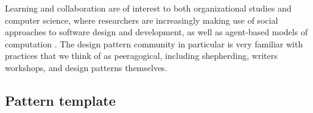 \begin{refsection}



Learning and collaboration are of interest to both organizational studies and computer science, where researchers are increasingly making use of social approaches to software design and development, as well as agent-based models of computation \cite{poetry-workshop}.
%
The design pattern community in particular is very familiar with practices that we think of as peeragogical, including shepherding, writers workshops, and design patterns themselves.  %

\subsection*{Pattern template}







\end{refsection}

